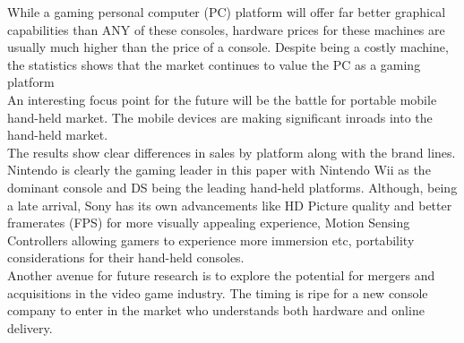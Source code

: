 \documentclass[conference]{IEEEtran}
\begin{document}
While a gaming personal computer (PC) platform will offer far better graphical capabilities than ANY of these consoles, hardware prices for these machines are usually much higher than the price of a console. Despite being a costly machine, the statistics shows that the market continues to value the PC as a gaming platform\\
An interesting focus point for the future will be the battle for portable mobile hand-held market. The mobile devices are making significant inroads into the hand-held market.\\
The results show clear differences in sales by platform along with the brand lines. Nintendo is clearly the gaming leader in this paper with Nintendo Wii as the dominant console and DS being the leading hand-held platforms. Although, being a late arrival, Sony has its own advancements like HD Picture quality and better framerates (FPS) for more visually appealing experience, Motion Sensing Controllers allowing gamers to experience more immersion etc, portability considerations for their hand-held consoles. \\
Another avenue for future research is to explore the potential for mergers and acquisitions in the video game industry. The timing is ripe for a new console company to enter in the market who understands both hardware and online delivery.
\end{document}
